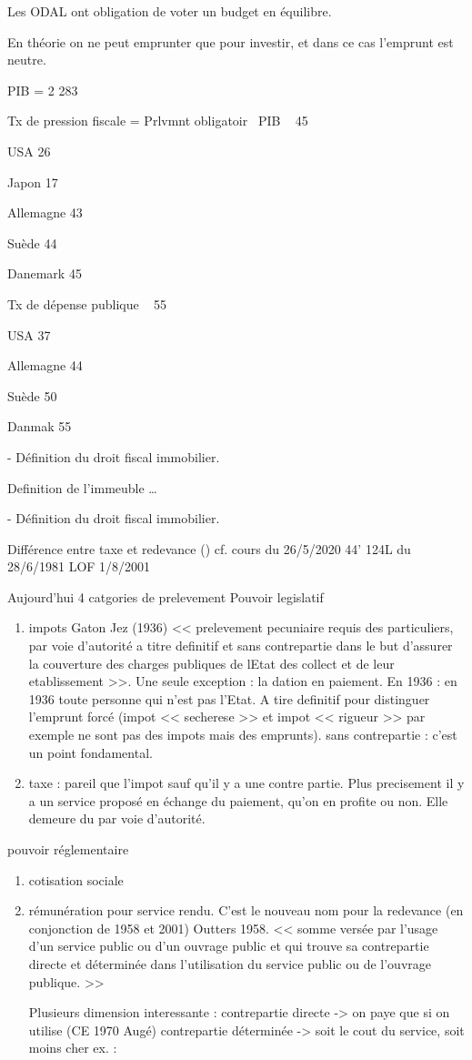 Les ODAL ont obligation de voter un budget en équilibre.

En théorie on ne peut emprunter que pour investir, et dans ce cas l’emprunt est neutre.

PIB = 2 283

Tx de pression fiscale = Prlvmnt obligatoir \ PIB ~ 45 %


USA 26 %

Japon 17 %

Allemagne 43 %

Suède 44%

Danemark 45 %


Tx de dépense publique ~ 55 %

USA 37

Allemagne 44 %

Suède 50 %

Danmak 55%


-	Définition du droit fiscal immobilier.


Definition de l’immeuble …



-	Définition du droit fiscal immobilier.

Différence entre taxe et redevance ()
cf. cours du 26/5/2020 44'
124L du 28/6/1981
LOF 1/8/2001

Aujourd'hui 4 catgories de prelevement
Pouvoir legislatif
\begin{enumerate}
  \item impots Gaton Jez (1936) << prelevement pecuniaire requis des particuliers, par voie d'autorité a titre definitif et sans contrepartie dans le but d'assurer la couverture des charges publiques de lEtat des collect et de leur etablissement >>. Une seule exception : la dation en paiement. En 1936 : en 1936 toute personne qui n'est pas l'Etat. A tire definitif pour distinguer l'emprunt forcé (impot << secherese >> et impot << rigueur >> par exemple ne sont pas des impots mais des emprunts). sans contrepartie : c'est un point fondamental.
  \item taxe : pareil que l'impot sauf qu'il y a une contre partie. Plus precisement il y a un service proposé en échange du paiement, qu'on en profite ou non. Elle demeure du par voie d'autorité.
\end{enumerate}

pouvoir réglementaire
\begin{enumerate}
  \item cotisation sociale
  \item rémunération pour service rendu. C'est le nouveau nom pour la redevance (en conjonction de 1958 et 2001)
  Outters 1958. << somme versée par l'usage d'un service public ou d'un ouvrage public et qui trouve sa contrepartie directe et déterminée dans l'utilisation du service public ou de l'ouvrage publique. >>

  Plusieurs dimension interessante : contrepartie directe -> on paye que si on utilise (CE 1970 Augé)
  contrepartie déterminée -> soit le cout du service, soit moins cher ex. :
\end{enumerate}
